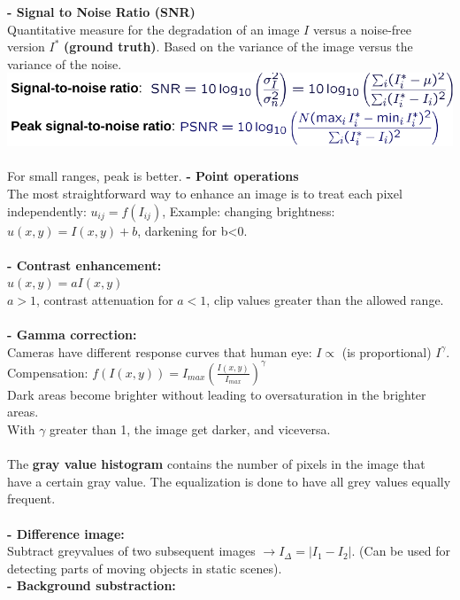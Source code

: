 \documentclass{article}
\begin{document}
\textbf{- Signal to Noise Ratio (SNR)}\\
Quantitative measure for the degradation of an image $I$ versus a noise-free version $I^*$\textbf{ (ground truth)}. Based on the variance of the image versus the variance of the noise.\\
\includegraphics[scale=0.3]{17.png}\\\\
For small ranges, peak is better.
\textbf{- Point operations}\\
The most straightforward way to enhance an image is to treat each pixel
independently: $u_{ij} = f(I_{ij})$, Example: changing brightness:\\
$u(x,y)=I(x,y)+b$, darkening for b<0.\\\\
\textbf{- Contrast enhancement: }\\
$u(x,y)=aI(x,y)$\\
$a>1$, contrast attenuation for $a<1$, clip values greater than the allowed range.\\\\
\textbf{- Gamma correction: }\\
Cameras have different response curves that human eye: $I \propto $ (is proportional) $ I^\gamma$.\\
Compensation: $f(I(x,y)) = I_{max}(\frac{I(x,y)}{I_{max}})^\gamma$\\
Dark areas become brighter without leading to oversaturation in the brighter areas.\\
With $\gamma$ greater than 1, the image get darker, and viceversa.\\\\
The \textbf{gray value histogram} contains the number of pixels in the image that
have a certain gray value. The equalization is done to have all grey values equally frequent.\\\\
\textbf{- Difference image:}\\
Subtract greyvalues of two subsequent images $\longrightarrow I_\Delta = |I_1-I_2|$. (Can be used for detecting parts of moving objects in static scenes).\\
\textbf{- Background substraction:} \\
\end{document}
